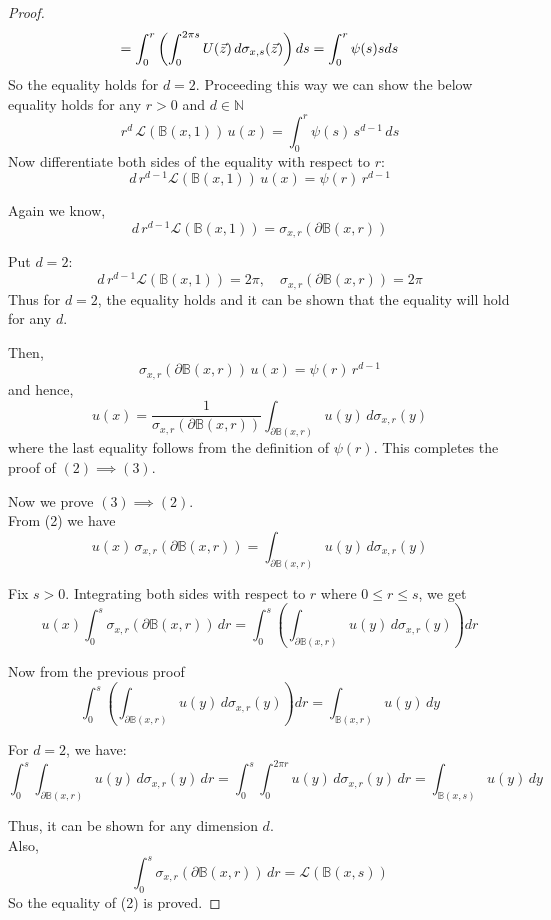 \documentclass{article}
\numberwithin{equation}{section}
\begin{document}
\begin{proof}
\[
= \int_0^r \left( \int_0^{2\pi s} U(\vec{z})\,d\sigma_{x,s}(\vec{z}) \right) ds\\
=\int_0^r \psi(s) s ds
\]
\noindent So the equality holds for \(d = 2\).
Proceeding this way we can show the below equality holds for any \(r > 0 \) and \(d \in \mathbb{N}\)
\[
r^d \, \mathscr{L}(\mathbb{B}(x,1)) \, u(x) = \int_0^r \psi(s)\,s^{d-1}\,ds
\]
Now differentiate both sides of the equality with respect to \( r \):
\[
d\, r^{d-1} \mathscr{L}(\mathbb{B}(x,1))\, u(x) = \psi(r)\, r^{d-1}
\]

Again we know,  
\[
d\, r^{d-1} \mathscr{L}(\mathbb{B}(x,1)) = \sigma_{x,r}(\partial \mathbb{B}(x, r))
\]

Put \( d = 2 \):  
\[
d\, r^{d-1} \mathscr{L}(\mathbb{B}(x,1)) = 2\pi,\quad \sigma_{x,r}(\partial \mathbb{B}(x, r)) = 2\pi
\]
\noindent Thus for \( d = 2 \), the equality holds and it can be shown that the equality will hold for any \( d \).

Then,  
\[
\sigma_{x,r}(\partial \mathbb{B}(x, r))\, u(x) = \psi(r)\, r^{d-1}
\]
and hence,
\[
u(x) = \frac{1}{\sigma_{x,r}(\partial \mathbb{B}(x, r))} \int_{\partial \mathbb{B}(x,r)} u(y)\, d\sigma_{x,r}(y)
\]
where the last equality follows from the definition of $\psi(r)$. This completes the proof of \((2) \implies (3)\).


\noindent Now we prove \( (3) \implies (2) \).\\
From (2) we have  
\[
u(x)\, \sigma_{x,r}(\partial \mathbb{B}(x,r)) = \int_{\partial \mathbb{B}(x,r)} u(y)\, d\sigma_{x,r}(y)
\]

Fix \( s > 0 \).  
Integrating both sides with respect to \(r\) where \(0 \leq r \leq s\), we get 
\[
u(x) \int_0^s \sigma_{x,r}(\partial \mathbb{B}(x,r))\, dr = \int_0^s \left( \int_{\partial \mathbb{B}(x,r)} u(y)\, d\sigma_{x,r}(y) \right) dr
\]

Now from the previous proof 
\[
\int_0^s\left(\int_{\partial \mathbb{B}(x,r)}u(y)\, d\sigma_{x,r}(y)\right)dr = \int_{\mathbb{B}(x,r)} u(y)\, dy
\]

For \( d = 2 \), we have:
\[
\int_0^s\int_{\partial \mathbb{B}(x,r)} u(y)\, d\sigma_{x,r}(y)\, dr = \int_0^s \int_0^{2\pi r} u(y)\, d\sigma_{x,r}(y)\, dr = \int_{\mathbb{B}(x,s)}u(y)\, dy
\]

Thus, it can be shown for any dimension \( d \).\\

Also,
\[
\int_0^s \sigma_{x,r}(\partial \mathbb{B}(x,r))\, dr = \mathscr{L}(\mathbb{B}(x,s))
\]
So the equality of (2) is proved.


\end{proof}
\end{document}
